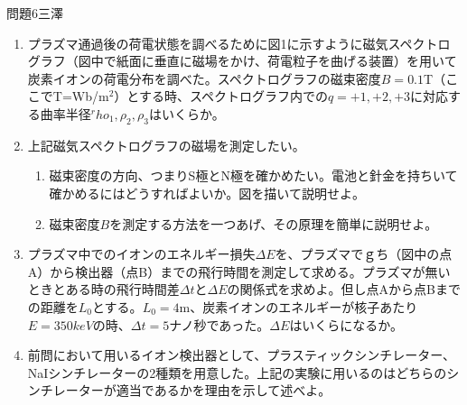 \documentclass[fleqn]{jbook}
\begin{document}
\begin{question}{問題6}{三澤}
\begin{enumerate}
\begin{enumerate}
\end{enumerate}
\item プラズマ通過後の荷電状態を調べるために図1に示すように磁気スペクトログラフ（図中で紙面に垂直に磁場をかけ、荷電粒子を曲げる装置）を用いて炭素イオンの荷電分布を調べた。スペクトログラフの磁束密度$B=0.1$T（ここでT=Wb/m$^2$）とする時、スペクトログラフ内での$q=+1,+2,+3$に対応する曲率半径$^rho_1,\rho_2,\rho_3$はいくらか。
\item 上記磁気スペクトログラフの磁場を測定したい。
\begin{enumerate}
\item 磁束密度の方向、つまりS極とN極を確かめたい。電池と針金を持ちいて確かめるにはどうすればよいか。図を描いて説明せよ。
\item 磁束密度$B$を測定する方法を一つあげ、その原理を簡単に説明せよ。
\end{enumerate}
\item プラズマ中でのイオンのエネルギー損失$\Delta E$を、プラズマでｇち（図中の点A）から検出器（点B）までの飛行時間を測定して求める。プラズマが無いときとある時の飛行時間差$\Delta t$と$\Delta E$の関係式を求めよ。但し点Aから点Bまでの距離を$L_0$とする。$L_0=4$m、炭素イオンのエネルギーが核子あたり$E=350keV$の時、$\Delta t=5$ナノ秒であった。$\Delta E$はいくらになるか。
\item 前問において用いるイオン検出器として、プラスティックシンチレーター、NaIシンチレーターの2種類を用意した。上記の実験に用いるのはどちらのシンチレーターが適当であるかを理由を示して述べよ。
\end{enumerate}
\end{question}
\end{document}

